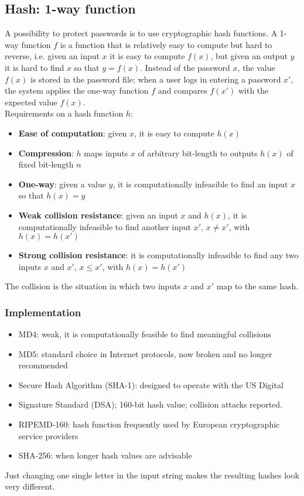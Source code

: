 \documentclass[a4paper, 10pt, titlepage]{article}
\begin{document}
\subsection{Hash: 1-way function}
A possibility to protect passwords is to use cryptographic hash functions. A 1-way function $f$ is a function that is relatively easy to compute but hard to reverse, i.e. given an input $x$ it is easy to compute $f(x)$, but given an output $y$ it is hard to find $x$ so that $y = f(x)$. Instead of the password $x$, the value $f(x)$ is stored in the password file; when a user logs in entering a password $x'$, the system applies the one-way function $f$ and compares $f(x')$ with the expected value $f(x)$.\\
Requirements on a hash function $h$:
\begin{itemize}
\item \textbf{Ease of computation}: given $x$, it is easy to compute $h(x)$
\item \textbf{Compression}: $h$ maps inputs $x$ of arbitrary bit-length to outputs $h(x)$ of fixed bit-length $n$
\item \textbf{One-way}: given a value $y$, it is computationally infeasible to find an input $x$ so that $h(x) = y$
\item \textbf{Weak collision resistance}: given an input $x$ and $h(x)$, it is computationally infeasible to find another input $x'$, $x \neq x'$, with $h(x) = h(x')$
\item \textbf{Strong collision resistance}: it is computationally infeasible to find any two inputs $x$ and $x'$, $x \leq x'$, with $h(x) = h(x')$
\end{itemize}
The collision is the situation in which two inputs $x$ and $x'$ map to the same hash. 
\subsubsection{Implementation}
\begin{itemize}
\item MD4: weak, it is computationally feasible to find meaningful collisions
\item MD5: standard choice in Internet protocols, now broken and no longer recommended
\item Secure Hash Algorithm (SHA-1): designed to operate with the US Digital
\item Signature Standard (DSA); 160-bit hash value; collision attacks reported.
\item RIPEMD-160: hash function frequently used by European cryptographic service providers
\item SHA-256: when longer hash values are advisable
\end{itemize}
Just changing one single letter in the input string makes the resulting hashes look very different.
\end{document}
